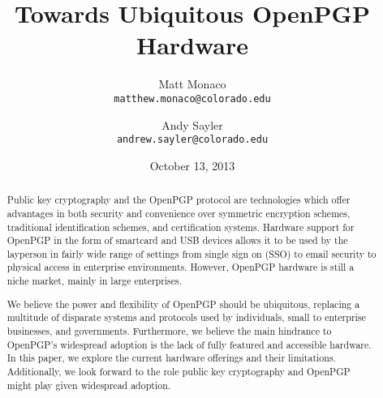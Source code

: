 \documentclass[letterpaper,twocolumn,10pt]{article}
\begin{document}
%
%

	\title{\Large \bf
		Towards Ubiquitous OpenPGP Hardware
	}

	\date{October 13, 2013}

	\author{
		Matt Monaco \\
		\texttt{matthew.monaco@colorado.edu}
		\and
		Andy Sayler \\
		\texttt{andrew.sayler@colorado.edu}
	}

	\maketitle

\begin{abstract}

Public key cryptography and the OpenPGP protocol are technologies which offer
advantages in both security and convenience over symmetric encryption schemes,
traditional identification schemes, and certification systems. Hardware support
for OpenPGP in the form of smartcard and USB devices allows it to be used by the
layperson in fairly wide range of settings from single sign on (SSO) to email
security to physical access in enterprise environments. However, OpenPGP
hardware is still a niche market, mainly in large enterprises.

We believe the power and flexibility of OpenPGP should be ubiquitous, replacing
a multitude of disparate systems and protocols used by individuals, small to
enterprise businesses, and governments. Furthermore, we believe the main
hindrance to OpenPGP's widespread adoption is the lack of fully featured and
accessible hardware. In this paper, we explore the current hardware offerings
and their limitations. Additionally, we look forward to the role public key
cryptography and OpenPGP might play given widespread adoption.

\end{abstract}

%
%


%
%

	\nocite{*}
	\footnotesize
	
	
\end{document}
